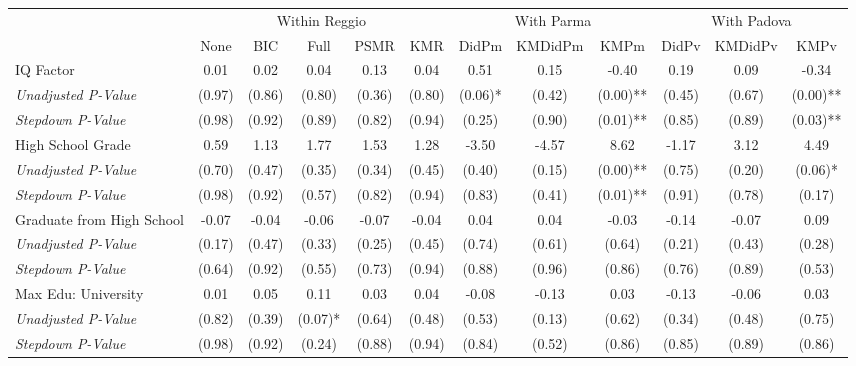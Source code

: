 \begin{tabular}{l c c c c c c c c c c c}
\toprule
& \multicolumn{5}{c}{Within Reggio} & \multicolumn{3}{c}{With Parma} & \multicolumn{3}{c}{With Padova} \\\cmidrule(lr){2-6} \cmidrule(lr){7-9} \cmidrule(lr){10-12}
 & None & BIC & Full & PSMR & KMR & DidPm & KMDidPm & KMPm & DidPv & KMDidPv & KMPv \\
\midrule
IQ Factor & 0.01 & 0.02 & 0.04 & 0.13 & 0.04 & 0.51 & 0.15 & -0.40 & 0.19 & 0.09 & -0.34 \\
\quad \textit{Unadjusted P-Value} & (0.97) & (0.86) & (0.80) & (0.36) & (0.80) & (0.06)* & (0.42) & (0.00)** & (0.45) & (0.67) & (0.00)** \\
\quad \textit{Stepdown P-Value} & (0.98) & (0.92) & (0.89) & (0.82) & (0.94) & (0.25) & (0.90) & (0.01)** & (0.85) & (0.89) & (0.03)** \\
High School Grade & 0.59 & 1.13 & 1.77 & 1.53 & 1.28 & -3.50 & -4.57 & 8.62 & -1.17 & 3.12 & 4.49 \\
\quad \textit{Unadjusted P-Value} & (0.70) & (0.47) & (0.35) & (0.34) & (0.45) & (0.40) & (0.15) & (0.00)** & (0.75) & (0.20) & (0.06)* \\
\quad \textit{Stepdown P-Value} & (0.98) & (0.92) & (0.57) & (0.82) & (0.94) & (0.83) & (0.41) & (0.01)** & (0.91) & (0.78) & (0.17) \\
Graduate from High School & -0.07 & -0.04 & -0.06 & -0.07 & -0.04 & 0.04 & 0.04 & -0.03 & -0.14 & -0.07 & 0.09 \\
\quad \textit{Unadjusted P-Value} & (0.17) & (0.47) & (0.33) & (0.25) & (0.45) & (0.74) & (0.61) & (0.64) & (0.21) & (0.43) & (0.28) \\
\quad \textit{Stepdown P-Value} & (0.64) & (0.92) & (0.55) & (0.73) & (0.94) & (0.88) & (0.96) & (0.86) & (0.76) & (0.89) & (0.53) \\
Max Edu: University & 0.01 & 0.05 & 0.11 & 0.03 & 0.04 & -0.08 & -0.13 & 0.03 & -0.13 & -0.06 & 0.03 \\
\quad \textit{Unadjusted P-Value} & (0.82) & (0.39) & (0.07)* & (0.64) & (0.48) & (0.53) & (0.13) & (0.62) & (0.34) & (0.48) & (0.75) \\
\quad \textit{Stepdown P-Value} & (0.98) & (0.92) & (0.24) & (0.88) & (0.94) & (0.84) & (0.52) & (0.86) & (0.85) & (0.89) & (0.86) \\
\bottomrule
\end{tabular}
